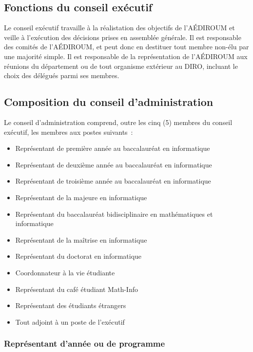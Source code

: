 \documentclass{aediroum}
\begin{document}
\subsection{Fonctions du conseil exécutif}\label{sec:fonctions-du-conseil-executif}

Le conseil exécutif travaille à la réalistation des objectifs de l'AÉDIROUM et veille à l'exécution des décisions prises en assemblée générale. Il est responsable des comités de l'AÉDIROUM, et peut donc en destituer tout membre non-élu par une majorité simple. Il est responsable de la représentation de l'AÉDIROUM aux réunions du département ou de tout organisme extérieur au DIRO, incluant le choix des délégués parmi ses membres.

\subsection{Composition du conseil d'administration}\label{sec:composition-du-conseil-dadministration}

Le conseil d'administration comprend, outre les cinq (5) membres du conseil exécutif, les membres aux postes suivants~:
\begin{itemize}
\item Représentant de première année au baccalauréat en informatique
\item Représentant de deuxième année au baccalauréat en informatique
\item Représentant de troisième année au baccalauréat en informatique
\item Représentant de la majeure en informatique
\item Représentant du baccalauréat bidisciplinaire en mathématiques et informatique
\item Représentant de la maîtrise en informatique
\item Représentant du doctorat en informatique
\item Coordonnateur à la vie étudiante
\item Représentant du café étudiant Math-Info
\item Représentant des étudiants étrangers
\item Tout adjoint à un poste de l'exécutif
\end{itemize}

\subsubsection{Représentant d'année ou de programme}\label{sec:representant-dannee-ou-de-programme}
\end{document}
